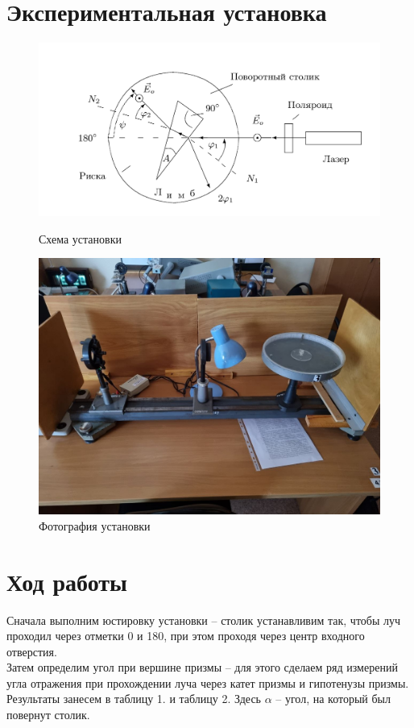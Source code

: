 \documentclass[a4paper,12pt]{article}
\begin{document}
\section*{Экспериментальная установка}
\begin{figure}[H]
    \centering
  \begin{minipage}[b]{0.45\textwidth}
    \includegraphics[width=\textwidth]{ust.png}
    \caption{Схема установки}
  \end{minipage}
  \hfill
  \begin{minipage}[b]{0.45\textwidth}
    \includegraphics[width=\textwidth]{ex1.jpg}
    \caption{Фотография установки}
  \end{minipage}
\end{figure}

\section*{Ход работы}
Сначала выполним юстировку установки -- столик устанавливим так, чтобы луч проходил через отметки 0 и 180, при этом проходя через центр входного отверстия. \\
Затем определим угол при вершине призмы -- для этого сделаем ряд измерений угла отражения при прохождении луча через катет призмы и гипотенузы призмы. Результаты занесем в таблицу 1. и таблицу 2. Здесь $\alpha$ -- угол, на который был повернут столик.
\end{document}
